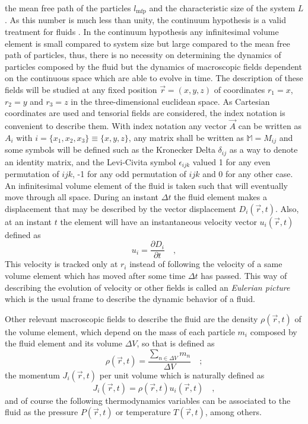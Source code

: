 the mean free path of the particles $l_{\text{mfp}}$ and the characteristic size of the system $L$. As this number is much less than unity, the continuum hypothesis is a valid treatment for fluids \cite[sec.~1.1]{Kruger}. In the continuum hypothesis any infinitesimal volume element is small compared to system size but large compared to the mean free path of particles, thus, there is no necessity on determining the dynamics of particles composed by the fluid but the dynamics of macroscopic fields dependent on the continuous space which are able to evolve in time. The description of these fields will be studied at any fixed position $\vec r = (x, y, z)$ of coordinates $r_1 = x$, $r_2 = y$ and $r_3 = z$ in the three-dimensional euclidean space. As Cartesian coordinates are used and tensorial fields are considered, the index notation is convenient to describe them. With index notation any vector $\vec A$ can be written as $A_i$ with $i=\{x_1,x_2,x_3\}\equiv\{x,y,z\}$, any matrix shall be written as $\mathbb{M} = M_{ij}$ and some symbols will be defined such as the Kronecker Delta $\delta_{ij}$ as a way to denote an identity matrix, and the Levi-Civita symbol $\epsilon_{ijk}$ valued 1 for any even permutation of $ijk$, -1 for any odd permutation of $ijk$ and 0 for any other case. An infinitesimal volume element of the fluid is taken such that will eventually move through all space. During an instant $\Delta t$ the fluid element makes a displacement that may be described by the vector displacement $D_i(\vec r,t)$. Also, at an instant $t$ the element will have an instantaneous velocity vector $u_i(\vec r,t)$ defined as
\begin{equation}\label{intro.fluids.eq:u_fluid_def}
    u_i = \frac{\partial D_i}{\partial t}\quad,
\end{equation}
This velocity is tracked only at $r_i$ instead of following the velocity of a same volume element which has moved after some time $\Delta t$ has passed. This way of describing the evolution of velocity or other fields is called an \textit{Eulerian picture} \cite{Bruus2011_01} which is the usual frame to describe the dynamic behavior of a fluid. 

Other relevant macroscopic fields to describe the fluid are the density $\rho(\vec r,t)$ of the volume element, which depend on the mass of each particle $m_i$ composed by the fluid element and its volume $\Delta V$, so that is defined as
\begin{equation}\label{intro.fluids.eq:rho_def}
    \rho(\vec r, t) = \frac{\sum_{n\in \Delta V}m_n}{\Delta V}\quad;
\end{equation}
the momentum $J_i(\vec r,t)$ per unit volume which is naturally defined as
\begin{equation}\label{intro.fluids.eq:J_def}
    J_i(\vec r, t) = \rho(\vec r, t)u_i(\vec r,t)\quad,
\end{equation}
and of course the following thermodynamics variables can be associated to the fluid as the pressure $P(\vec r,t)$ or temperature $T(\vec r,t)$, among others. 

